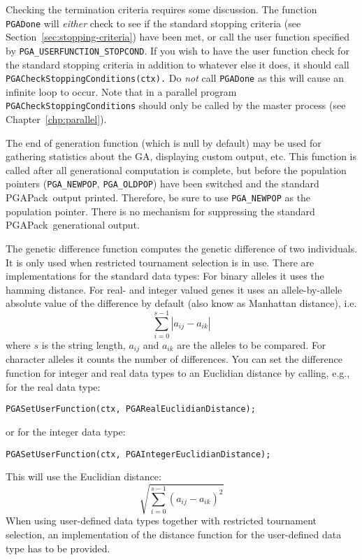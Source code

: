 \documentclass{report}
\newcommand{\pga}{PGAPack}
\begin{document}
Checking the termination criteria requires some discussion.  The function {\tt
PGADone} will {\em either} check to see if the standard stopping criteria (see
Section~\ref{sec:stopping-criteria}) have been met, or call the user function
specified by {\tt PGA\_USERFUNCTION\_STOPCOND}.  If you wish to have the user
function check for the  standard stopping criteria  in addition to whatever
else it does, it should call {\tt PGACheckStoppingConditions(ctx).}
Do {\em not} call {\tt PGADone} as this will cause an infinite loop to occur.
Note that in a parallel program {\tt PGACheckStoppingConditions} should only
be called by the master process (see Chapter~\ref{chp:parallel}).

The end of generation function (which is null by default) may be used for
gathering statistics about the GA, displaying custom output, etc.  This
function is called after all generational computation is complete, but before
the population pointers ({\tt PGA\_NEWPOP}, {\tt PGA\_OLDPOP}) have been
switched and the standard \pga\ output printed.  Therefore, be sure to use
{\tt PGA\_NEWPOP} as the population pointer.  There is no mechanism for
suppressing the standard \pga\ generational output.

The genetic difference function\label{gendiff} computes the genetic
difference of two individuals. It is only used when restricted
tournament selection is in use. There are implementations for the
standard data types: For binary alleles it uses the hamming distance.
For real- and integer valued genes it uses an allele-by-allele absolute
value of the difference by default (also know as Manhattan distance),
i.e. $$\sum_{i=0}^{s-1}|a_{ij} - a_{ik}|$$
where $s$ is the string length, $a_{ij}$ and $a_{ik}$ are the alleles to be
compared. For character alleles it counts the number of
differences. You can set the difference function for integer and real
data types to an Euclidian distance by calling, e.g., for the real data
type:

\verb+PGASetUserFunction(ctx, PGARealEuclidianDistance);+

\noindent or for the integer data type:

\verb+PGASetUserFunction(ctx, PGAIntegerEuclidianDistance);+

\noindent This will use the Euclidian distance:
$$\sqrt{\sum_{i=0}^{s-1}(a_{ij} - a_{ik})^2}$$
When using user-defined data types together with restricted
tournament selection, an implementation of the distance function for the
user-defined data type has to be provided.
\end{document}
